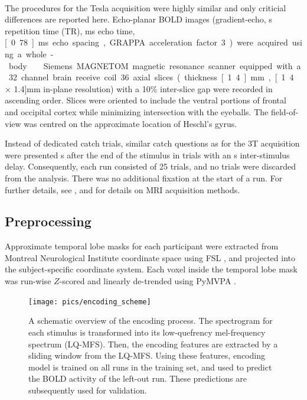 \paragraph{\sevenT}
%
The procedures for the \unit[7]{Tesla} acquisition were highly similar and only
criticial differences are reported here. Echo-planar BOLD images
(gradient-echo, \unit[2]{s} repetition time (TR), \unit[22]{ms} echo time,
\unit[0.78]{ms} echo spacing, GRAPPA acceleration factor 3) were acquired using
a whole-body \sevenT\ Siemens MAGNETOM magnetic resonance scanner equipped with
a 32 channel brain receive coil. 36 axial slices (thickness \unit[1.4]{mm},
\unit[1.4 $\times$ 1.4]{mm} in-plane resolution) with a 10\% inter-slice gap
were recorded in ascending order.  Slices were oriented to include the ventral
portions of frontal and occipital cortex while minimizing intersection with the
eyeballs. The field-of-view was centred on the approximate location of Heschl's
gyrus.

Instead of dedicated catch trials, similar catch questions as for the 3T
acquisition were presented \unit[4]{s} after the end of the stimulus in trials
with an \unit[8]{s} inter-stimulus delay. Consequently, each run consisted of
25 trials, and no trials were discarded from the analysis.  There was no
additional fixation at the start of a run. For further details, see
\citet{HDH+2015}, and \citet{HBI+14} for details on MRI acquisition methods.


\subsection*{Preprocessing}

Approximate temporal lobe masks for each participant were extracted from
Montreal Neurological Institute coordinate space using FSL
\citep{SJB+04,JBB+12}, and projected into the subject-specific coordinate
system.  Each voxel inside the temporal lobe mask was run-wise $Z$-scored and
linearly de-trended using PyMVPA \citep{HHS09b}. 

\begin{figure}
  \centering
  \texttt{[image: pics/encoding\_scheme]}

  \caption{A schematic overview of the encoding process. The spectrogram for
    each stimulus is transformed into its low-quefrency mel-frequency spectrum
    (LQ-MFS). Then, the encoding features are extracted by a sliding window
    from the LQ-MFS. Using these features, encoding model is trained on all
    runs in the training set, and used to predict the BOLD activity of the
  left-out run.  These predictions are subsequently used for validation.}

 \label{fig:encoding_scheme}
\end{figure}

